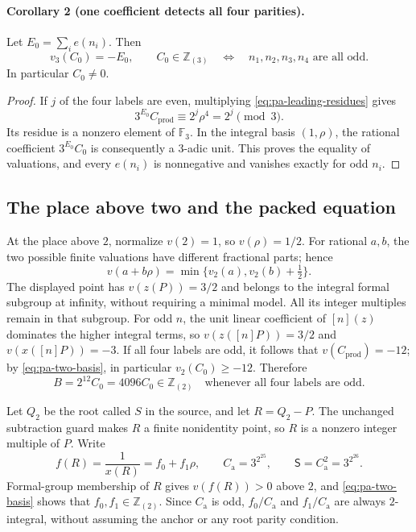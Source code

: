 \paragraph{Corollary 2 (one coefficient detects all four parities).}
Let $E_0=\sum_i e(n_i)$.  Then
\begin{equation}\label{eq:pa-product-parity}
 v_3(C_0)=-E_0,\qquad
 C_0\in\mathbb Z_{(3)}
 \quad\Longleftrightarrow\quad n_1,n_2,n_3,n_4\text{ are all odd}.
\end{equation}
In particular $C_0\ne0$.

\begin{proof}
If $j$ of the four labels are even, multiplying
\eqref{eq:pa-leading-residues} gives
\[
 3^{E_0}C_{\mathrm{prod}}\equiv
 2^j\rho^4=2^j\pmod3.
\]
Its residue is a nonzero element of $\mathbb F_3$.  In the integral
basis $(1,\rho)$, the rational coefficient $3^{E_0}C_0$ is consequently
a $3$-adic unit.  This proves the equality of valuations, and every
$e(n_i)$ is nonnegative and vanishes exactly for odd $n_i$.
\end{proof}

\subsection{The place above two and the packed equation}

At the place above $2$, normalize $v(2)=1$, so $v(\rho)=1/2$.
For rational $a,b$, the two possible finite valuations have different
fractional parts; hence
\begin{equation}\label{eq:pa-two-basis}
 v(a+b\rho)=\min\{v_2(a),v_2(b)+\tfrac12\}.
\end{equation}
The displayed point has $v(z(P))=3/2$ and belongs to the integral
formal subgroup at infinity, without requiring a minimal model.
All its integer multiples remain in that subgroup.  For odd $n$, the
unit linear coefficient of $[n](z)$ dominates the higher integral terms,
so $v(z([n]P))=3/2$ and $v(x([n]P))=-3$.
If all four labels are odd, it follows that
$v(C_{\mathrm{prod}})=-12$; by \eqref{eq:pa-two-basis}, in particular
$v_2(C_0)\ge-12$.  Therefore
\begin{equation}\label{eq:pa-B}
 B=2^{12}C_0=4096C_0\in\mathbb Z_{(2)}
 \quad\text{whenever all four labels are odd}.
\end{equation}

Let $Q_2$ be the root called $S$ in the source, and let $R=Q_2-P$.
The unchanged subtraction guard makes $R$ a finite nonidentity point,
so $R$ is a nonzero integer multiple of $P$.  Write
\[
 f(R)=\frac1{x(R)}=f_0+f_1\rho,\qquad
 C_{\mathrm a}=3^{2^{25}},\qquad
 \mathsf S=C_{\mathrm a}^2=3^{2^{26}}.
\]
Formal-group membership of $R$ gives $v(f(R))>0$ above $2$, and
\eqref{eq:pa-two-basis} shows that $f_0,f_1\in\mathbb Z_{(2)}$.
Since $C_{\mathrm a}$ is odd,
$f_0/C_{\mathrm a}$ and $f_1/C_{\mathrm a}$ are always $2$-integral,
without assuming the anchor or any root parity condition.

